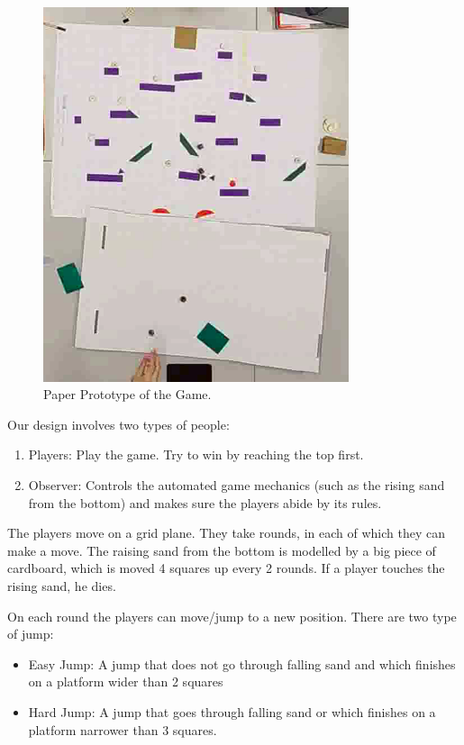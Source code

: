 \begin{figure}
    \centering
    \includegraphics[width=0.8\textwidth]{figures/Prototype/vlcsnap-2022-03-20-18h52m10s352.png}
    \caption{Paper Prototype of the Game.}
    \label{fig:prot_0}
\end{figure}

Our design involves two types of people:
\begin{enumerate}
    \item Players: Play the game. Try to win by reaching the top first.
    \item Observer: Controls the automated game mechanics (such as the rising sand from the bottom) and makes sure the players abide by its rules.
\end{enumerate}

The players move on a grid plane. They take rounds, in each of which they can make a move. The raising sand from the bottom is modelled by a big piece of cardboard, which is moved 4 squares up every 2 rounds. If a player touches the rising sand, he dies.

On each round the players can move/jump to a new position.
There are two type of jump:
\begin{itemize}
    \item Easy Jump: A jump that does not go through falling sand and which finishes on a platform wider than 2 squares
    \item Hard Jump: A jump that goes through falling sand or which finishes on a platform narrower than 3 squares.
\end{itemize}

